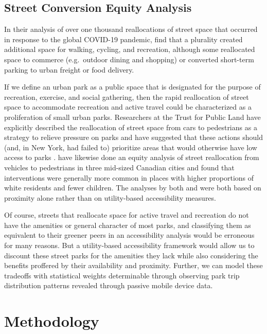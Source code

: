 \documentclass[3p, authoryear, review, doubleblind]{elsarticle} %
\begin{document}
\hypertarget{street-conversion-equity-analysis}{%
\subsection{Street Conversion Equity Analysis}\label{street-conversion-equity-analysis}}

In their analysis of over one thousand reallocations of street space that
occurred in response to the global COVID-19 pandemic, \citet{combs2021shifting} find
that a plurality created additional space for walking, cycling, and recreation,
although some reallocated space to commerce (e.g.~outdoor dining and shopping)
or converted short-term parking to urban freight or food delivery.

If we define an urban park as a public space that is designated for the purpose
of recreation, exercise, and social gathering, then the rapid reallocation of
street space to accommodate recreation and active travel could be characterized
as a proliferation of small urban parks. Researchers at the Trust for Public
Land have explicitly described the reallocation of street space from cars to
pedestrians as a strategy to relieve pressure on parks \citep{hussain_parks_2020} and
have suggested that these actions should (and, in New York, had failed to)
prioritize areas that would otherwise have low access to parks
\citep{compton_parks_2020}. \citet{fischer_covid-19_2021} have likewise done an equity
analysis of street reallocation from vehicles to pedestrians in three mid-sized
Canadian cities and found that interventions were generally more common in
places with higher proportions of white residents and fewer children. The
analyses by both \citet{compton_parks_2020} and \citet{fischer_covid-19_2021} were both based
on proximity alone rather than on utility-based accessibility measures.

Of course, streets that reallocate space for active travel and recreation do not
have the amenities or general character of most parks, and classifying them as
equivalent to their greener peers in an accessibility analysis would be
erroneous for many reasons. But a utility-based accessibility framework would
allow us to discount these street parks for the amenities they lack while also
considering the benefits proffered by their availability and proximity. Further,
we can model these tradeoffs with statistical weights determinable through
observing park trip distribution patterns revealed through passive mobile device
data.

\hypertarget{methodology}{%
\section{Methodology}\label{methodology}}
\end{document}
